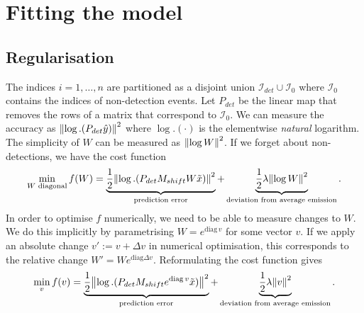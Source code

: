 \documentclass{article}
\begin{document}
\section{Fitting the model}
\subsection{Regularisation}
The indices $i = 1,\dots,n$ are partitioned as a disjoint union $\mathcal{I}_{det} \cup \mathcal{I}_{0}$ where $\mathcal{I}_0$ contains the indices of non-detection events. Let $P_{det}$ be the linear map that removes the rows of a matrix that correspond to $\mathcal{I}_0$. We can measure the accuracy as $\norm{\log.(P_{det} \hat{y})}^2$ where $\log.(\cdot)$ is the elementwise \emph{natural} logarithm. The simplicity of $W$ can be measured as $\norm{\log W}^2$. If we forget about non-detections, we have the cost function 
$$
\min_{W \text{ diagonal}} f(W) =
\underbrace{\frac{1}{2}\norm{\log.(P_{det} M_{shift} W \tilde{x})}^2}_{\text{prediction error}} + \underbrace{\frac{1}{2}\lambda \norm{\log W}^2}_{\text{deviation from average emission}}
.$$
In order to optimise $f$ numerically, we need to be able to measure changes to $W$. We do this implicitly by parametrising $W = e^{\mathrm{diag}\, v}$ for some vector $v$. If we apply an absolute change $v' := v + \Delta v$ in numerical optimisation, this corresponds to the relative change $W' = W e^{\mathrm{diag} \Delta v}$. 
Reformulating the cost function gives 
$$
\min_{v} f(v) =
\underbrace{\frac{1}{2}\norm{\log.(P_{det} M_{shift} e^{\mathrm{diag}\, v} \tilde{x})}^2}_{\text{prediction error}} + \underbrace{\frac{1}{2}\lambda \norm{v}^2}_{\text{deviation from average emission}}
.$$
\end{document}
